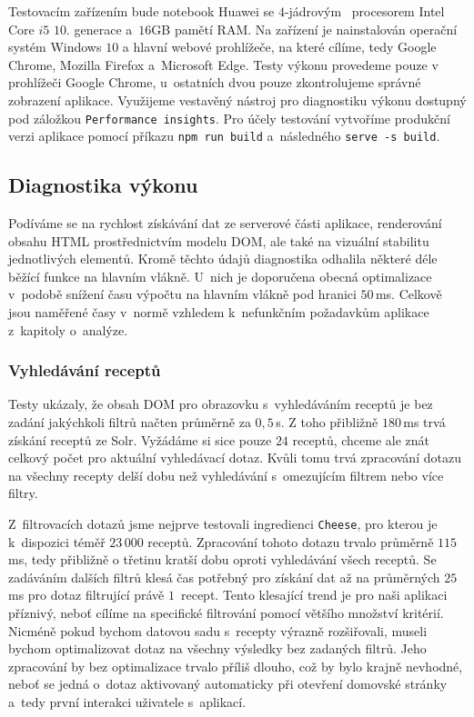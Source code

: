 Testovacím zařízením bude notebook Huawei se $4$-jádrovým ~procesorem Intel Core $i5$ $10$. generace a~$16$GB pamětí RAM. Na zařízení je nainstalován operační systém Windows $10$ a hlavní webové prohlížeče, na které cílíme, tedy Google Chrome, Mozilla Firefox a~Microsoft Edge. Testy výkonu provedeme pouze v prohlížeči Google Chrome, u~ostatních dvou pouze zkontrolujeme správné zobrazení aplikace. Využijeme vestavěný nástroj pro diagnostiku výkonu dostupný pod záložkou \texttt{Performance insights}. Pro účely testování vytvoříme produkční verzi aplikace pomocí příkazu \texttt{npm\,run\,build} a~následného \texttt{serve\,-s\,build}.

\subsection{Diagnostika výkonu}

Podíváme se na rychlost získávání dat ze serverové části aplikace, renderování obsahu HTML prostřednictvím modelu DOM, ale také na vizuální stabilitu jednotlivých elementů. Kromě těchto údajů diagnostika odhalila některé déle běžící funkce na hlavním vlákně. U~nich je doporučena obecná optimalizace v~podobě snížení času výpočtu na hlavním vlákně pod hranici $50\,$ms. Celkově jsou naměřené časy v~normě vzhledem k~nefunkčním požadavkům aplikace z~kapitoly o~analýze.

\subsubsection{Vyhledávání receptů}

Testy ukázaly, že obsah DOM pro obrazovku s~vyhledáváním receptů je bez zadání jakýchkoli filtrů načten průměrně za $0,5\,$s. Z toho přibližně $180\,$ms trvá získání receptů ze Solr. Vyžádáme si sice pouze $24$ receptů, chceme ale znát celkový počet pro aktuální vyhledávací dotaz. Kvůli tomu trvá zpracování dotazu na všechny recepty delší dobu než vyhledávání s~omezujícím filtrem nebo více filtry.

Z~filtrovacích dotazů jsme nejprve testovali ingredienci \texttt{Cheese}, pro kterou je k~dispozici téměř $23\,000$ receptů. Zpracování tohoto dotazu trvalo průměrně $115\,$ms, tedy přibližně o třetinu kratší dobu oproti vyhledávání všech receptů. Se zadáváním dalších filtrů klesá čas potřebný pro získání dat až na průměrných $25\,$ms pro dotaz filtrující právě $1$~recept. Tento klesající trend je pro naši aplikaci příznivý, neboť cílíme na specifické filtrování pomocí většího množství kritérií. Nicméně pokud bychom datovou sadu s~recepty výrazně rozšiřovali, museli bychom optimalizovat dotaz na všechny výsledky bez zadaných filtrů. Jeho zpracování by bez optimalizace trvalo příliš dlouho, což by bylo krajně nevhodné, neboť se jedná o~dotaz aktivovaný automaticky při otevření domovské stránky a~tedy první interakci uživatele s~aplikací.

